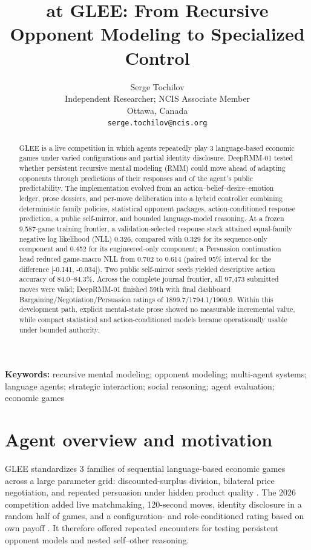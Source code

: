 \documentclass{article}
\title{\DeepRMM{} at GLEE: From Recursive Opponent Modeling to Specialized Control}
\author{Serge Tochilov\\Independent Researcher; NCIS Associate Member\\Ottawa, Canada\\\texttt{serge.tochilov@ncis.org}}
\newcommand{\DeepRMM}{DeepRMM-01}
\begin{document}
\maketitle

\begin{abstract}
GLEE is a live competition in which agents repeatedly play 3 language-based economic games under varied configurations and partial identity disclosure. \DeepRMM{} tested whether persistent recursive mental modeling (RMM) could move ahead of adapting opponents through predictions of their responses and of the agent's public predictability. The implementation evolved from an action--belief--desire--emotion ledger, prose dossiers, and per-move deliberation into a hybrid controller combining deterministic family policies, statistical opponent packages, action-conditioned response prediction, a public self-mirror, and bounded language-model reasoning. At a frozen 9,587-game training frontier, a validation-selected response stack attained equal-family negative log likelihood (NLL) 0.326, compared with 0.329 for its sequence-only component and 0.452 for its engineered-only component; a Persuasion continuation head reduced game-macro NLL from 0.702 to 0.614 (paired 95\% interval for the difference [-0.141, -0.034]). Two public self-mirror seeds yielded descriptive action accuracy of 84.0--84.3\%. Across the complete journal frontier, all 97,473 submitted moves were valid; \DeepRMM{} finished 59th with final dashboard Bargaining/Negotiation/Persuasion ratings of 1899.7/1794.1/1900.9. Within this development path, explicit mental-state prose showed no measurable incremental value, while compact statistical and action-conditioned models became operationally usable under bounded authority.
\end{abstract}

\noindent\textbf{Keywords:} recursive mental modeling; opponent modeling; multi-agent systems; language agents; strategic interaction; social reasoning; agent evaluation; economic games

\section{Agent overview and motivation}

GLEE standardizes 3 families of sequential language-based economic games across a large parameter grid: discounted-surplus division, bilateral price negotiation, and repeated persuasion under hidden product quality \citep{shapira2026glee}. The 2026 competition added live matchmaking, 120-second moves, identity disclosure in a random half of games, and a configuration- and role-conditioned rating based on own payoff \citep{glee2026docs}. It therefore offered repeated encounters for testing persistent opponent models and nested self--other reasoning.
\end{document}
